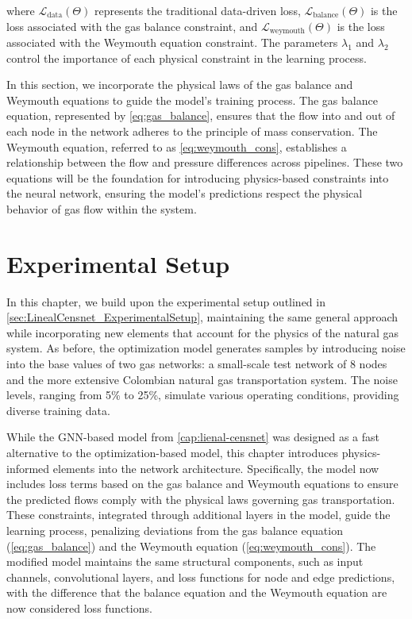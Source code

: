 
where \( \mathcal{L}_{\text{data}}(\Theta) \) represents the traditional data-driven loss, \( \mathcal{L}_{\text{balance}}(\Theta) \) is the loss associated with the gas balance constraint, and \( \mathcal{L}_{\text{weymouth}}(\Theta) \) is the loss associated with the Weymouth equation constraint. The parameters \( \lambda_1 \) and \( \lambda_2 \) control the importance of each physical constraint in the learning process.


In this section, we incorporate the physical laws of the gas balance and Weymouth equations to guide the model's training process. The gas balance equation, represented by \cref{eq:gas_balance}, ensures that the flow into and out of each node in the network adheres to the principle of mass conservation. The Weymouth equation, referred to as \cref{eq:weymouth_cons}, establishes a relationship between the flow and pressure differences across pipelines. These two equations will be the foundation for introducing physics-based constraints into the neural network, ensuring the model's predictions respect the physical behavior of gas flow within the system.


\section{Experimental Setup}

In this chapter, we build upon the experimental setup outlined in \cref{sec:LinealCensnet_ExperimentalSetup}, maintaining the same general approach while incorporating new elements that account for the physics of the natural gas system. As before, the optimization model generates samples by introducing noise into the base values of two gas networks: a small-scale test network of 8 nodes and the more extensive Colombian natural gas transportation system. The noise levels, ranging from 5\% to 25\%, simulate various operating conditions, providing diverse training data.

While the GNN-based model from \cref{cap:lienal-censnet} was designed as a fast alternative to the optimization-based model, this chapter introduces physics-informed elements into the network architecture. Specifically, the model now includes loss terms based on the gas balance and Weymouth equations to ensure the predicted flows comply with the physical laws governing gas transportation. These constraints, integrated through additional layers in the model, guide the learning process, penalizing deviations from the gas balance equation (\cref{eq:gas_balance}) and the Weymouth equation (\cref{eq:weymouth_cons}). The modified model maintains the same structural components, such as input channels, convolutional layers, and loss functions for node and edge predictions, with the difference that the balance equation and the Weymouth equation are now considered loss functions. 


